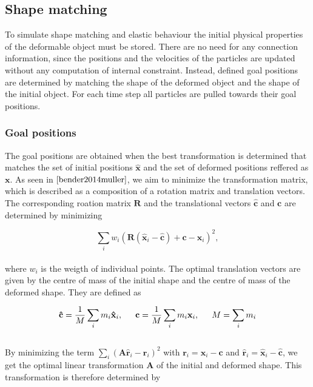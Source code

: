 \subsection{Shape matching}

To simulate shape matching and elastic behaviour the initial physical properties of the deformable
object must be stored. There are no need for any connection information, since the positions and the velocities of the particles
are updated without any computation of internal constraint. Instead, defined goal positions are determined by matching the shape of the deformed
object and the shape of the initial object. For each time step all particles are pulled towards their goal positions.

\subsubsection{Goal positions}
The goal positions are obtained when the best transformation is determined that matches the set of initial positions
$\mathbf{\hat{x}}$ and the set of deformed positions reffered as $\mathbf{x}$. As seen in $\cite{bender2014muller}$, we aim to minimize the transformation matrix,
which is described as a composition of a rotation matrix
and translation vectors. The corresponding roation matrix $\mathbf{R}$ and the translational vectors
$\mathbf{\hat{c}}$ and $\mathbf{c}$ are determined by minimizing

\begin{equation}
\label{eq:MinR}
\sum\limits_{i} w_{i}\left(\mathbf{R}(\mathbf{\hat{x}}_{i} - \mathbf{\hat{c}}) + \mathbf{c} - \mathbf{x}_{i} \right)^{2},
\end{equation}
\\
where $w_{i}$ is the weigth of individual points. The optimal translation vectors are given by the centre of mass of the initial shape and the centre of mass
of the deformed shape. They are defined as

\begin{equation}
\label{eq:TransVec}
\mathbf{\hat{c}} = \frac{1}{M} \sum\limits_{i} m_{i}\mathbf{\hat{x}}_{i} , \indent
\mathbf{c} = \frac{1}{M} \sum\limits_{i} m_{i}\mathbf{x}_{i} , \indent
M = \sum\limits_{i} m_{i}
\end{equation}
\\
By minimizing the term $\sum\limits_{i} (\mathbf{A}\mathbf{\hat{r}}_{i} - \mathbf{r}_{i})^2$ with $ \mathbf{r}_{i} = \mathbf{x}_{i} -
\mathbf{c}$ and $\mathbf{\hat{r}}_{i} = \mathbf{\hat{x}}_{i} - \mathbf{\hat{c}} $, we get the optimal linear transformation $\mathbf{A}$
of the initial and deformed shape. This transformation is therefore determined by

